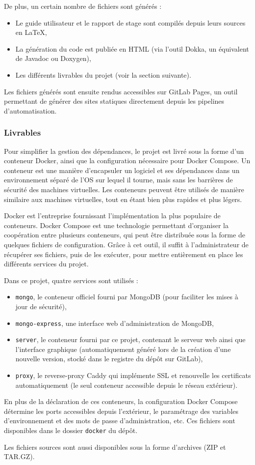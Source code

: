 De plus, un certain nombre de fichiers sont générés :
\begin{itemize}
	\item Le guide utilisateur et le rapport de stage sont compilés depuis leurs sources en LaTeX,
	\item La génération du code est publiée en HTML (via l'outil Dokka, un équivalent de Javadoc ou Doxygen),
	\item Les différents livrables du projet (voir la section suivante).
\end{itemize}
Les fichiers générés sont ensuite rendus accessibles sur GitLab Pages, un outil permettant de générer des sites statiques directement depuis les pipelines d'automatisation.

\subsubsection{Livrables}

Pour simplifier la gestion des dépendances, le projet est livré sous la forme d'un conteneur Docker, ainsi que la configuration nécessaire pour Docker Compose.
Un conteneur est une manière d'encapsuler un logiciel et ses dépendances dans un environnement séparé de l'OS sur lequel il tourne, mais sans les barrières de sécurité des machines virtuelles.
Les conteneurs peuvent être utilisés de manière similaire aux machines virtuelles, tout en étant bien plus rapides et plus légers.

Docker est l'entreprise fournissant l'implémentation la plus populaire de conteneurs.
Docker Compose est une technologie permettant d'organiser la coopération entre plusieurs conteneurs, qui peut être distribuée sous la forme de quelques fichiers de configuration.
Grâce à cet outil, il suffit à l'administrateur de récupérer ses fichiers, puis de les exécuter, pour mettre entièrement en place les différents services du projet.

Dans ce projet, quatre services sont utilisés :
\begin{itemize}
	\item \lstinline{mongo}, le conteneur officiel fourni par MongoDB (pour faciliter les mises à jour de sécurité),
	\item \lstinline{mongo-express}, une interface web d'administration de MongoDB,
	\item \lstinline{server}, le conteneur fourni par ce projet, contenant le serveur web ainsi que l'interface graphique (automatiquement généré lors de la création d'une nouvelle version, stocké dans le registre du dépôt sur GitLab),
	\item \lstinline{proxy}, le reverse-proxy Caddy qui implémente SSL et renouvelle les certificats automatiquement (le seul conteneur accessible depuis le réseau extérieur).
\end{itemize}
En plus de la déclaration de ces conteneurs, la configuration Docker Compose détermine les ports accessibles depuis l'extérieur, le paramétrage des variables d'environnement et des mots de passe d'administration, etc.
Ces fichiers sont disponibles dans le dossier \lstinline{docker} du dépôt.

Les fichiers sources sont aussi disponibles sous la forme d'archives (ZIP et TAR.GZ).
